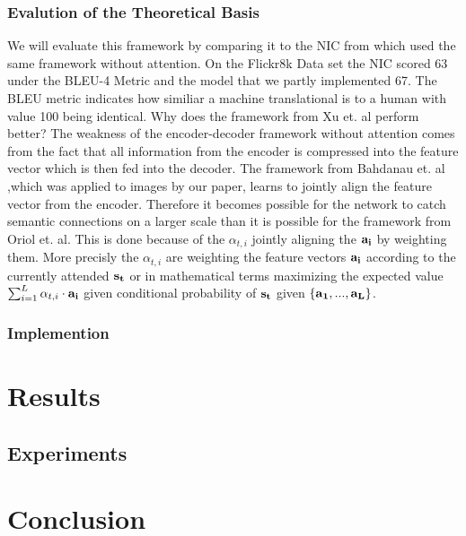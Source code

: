 \documentclass[12pt,letterpaper, twoside]{article}
\begin{document}
\subsubsection*{Evalution of the Theoretical Basis}
We will evaluate this framework by comparing it to the NIC from \cite{Oriol2015} which used the same framework without attention. On the Flickr8k Data set the NIC scored 63 under the BLEU-4 Metric and the model that we partly implemented 67. The BLEU metric indicates how similiar a machine translational is to a human with value 100 being identical. Why does the framework from Xu et. al perform better? The weakness of the encoder-decoder framework without attention comes from the fact that all information from the   encoder is compressed into the feature vector which is then fed into the decoder. The framework from Bahdanau et. al ,which was applied to images by our paper, learns to jointly align the feature vector from the encoder. Therefore it becomes possible for the network to catch semantic connections on a larger scale than it is possible for the framework from Oriol et. al. This is done because of the $\alpha_{t,i}$ jointly aligning the $\bf a_{i}$ by weighting them. More precisly the $\alpha_{t,i}$ are weighting the feature vectors $\bf a_{i}$ according to the currently attended $\bf s_{t}$ or in mathematical terms maximizing the expected value $\sum_{i=1}^L \alpha_{t,i}\cdot \bf a_{i}$ given conditional probability of $\bf s_{t}$ given $\{\bf a_{1},...,\bf a_{L}\}$.
\subsubsection{Implemention}
\section{Results}
\subsection{Experiments}
\section{Conclusion}
\newpage
{}

\end{document}
